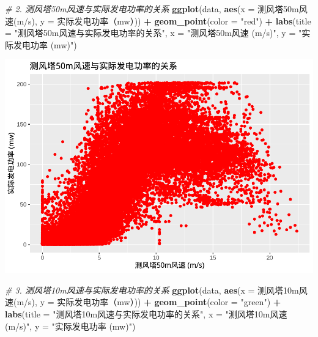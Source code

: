 \documentclass[
]{ctexart}
\newenvironment{Shaded}{\begin{snugshade}}{\end{snugshade}}
\newcommand{\AttributeTok}[1]{\textcolor[rgb]{0.13,0.29,0.53}{#1}}
\newcommand{\CommentTok}[1]{\textcolor[rgb]{0.56,0.35,0.01}{\textit{#1}}}
\newcommand{\FunctionTok}[1]{\textcolor[rgb]{0.13,0.29,0.53}{\textbf{#1}}}
\newcommand{\NormalTok}[1]{#1}
\newcommand{\SpecialCharTok}[1]{\textcolor[rgb]{0.81,0.36,0.00}{\textbf{#1}}}
\newcommand{\StringTok}[1]{\textcolor[rgb]{0.31,0.60,0.02}{#1}}
\begin{document}
\begin{Shaded}
\begin{Highlighting}[]
\CommentTok{\# 2. 测风塔50m风速与实际发电功率的关系}
\FunctionTok{ggplot}\NormalTok{(data, }\FunctionTok{aes}\NormalTok{(}\AttributeTok{x =} \StringTok{\textasciigrave{}}\AttributeTok{测风塔50m风速(m/s)}\StringTok{\textasciigrave{}}\NormalTok{, }\AttributeTok{y =} \StringTok{\textasciigrave{}}\AttributeTok{实际发电功率（mw）}\StringTok{\textasciigrave{}}\NormalTok{)) }\SpecialCharTok{+}
  \FunctionTok{geom\_point}\NormalTok{(}\AttributeTok{color =} \StringTok{"red"}\NormalTok{) }\SpecialCharTok{+}
  \FunctionTok{labs}\NormalTok{(}\AttributeTok{title =} \StringTok{"测风塔50m风速与实际发电功率的关系"}\NormalTok{,}
       \AttributeTok{x =} \StringTok{"测风塔50m风速 (m/s)"}\NormalTok{,}
       \AttributeTok{y =} \StringTok{"实际发电功率 (mw)"}\NormalTok{)}
\end{Highlighting}
\end{Shaded}

\includegraphics{1_files/figure-latex/unnamed-chunk-6-2.pdf}

\begin{Shaded}
\begin{Highlighting}[]
\CommentTok{\# 3. 测风塔10m风速与实际发电功率的关系}
\FunctionTok{ggplot}\NormalTok{(data, }\FunctionTok{aes}\NormalTok{(}\AttributeTok{x =} \StringTok{\textasciigrave{}}\AttributeTok{测风塔10m风速(m/s)}\StringTok{\textasciigrave{}}\NormalTok{, }\AttributeTok{y =} \StringTok{\textasciigrave{}}\AttributeTok{实际发电功率（mw）}\StringTok{\textasciigrave{}}\NormalTok{)) }\SpecialCharTok{+}
  \FunctionTok{geom\_point}\NormalTok{(}\AttributeTok{color =} \StringTok{"green"}\NormalTok{) }\SpecialCharTok{+}
  \FunctionTok{labs}\NormalTok{(}\AttributeTok{title =} \StringTok{"测风塔10m风速与实际发电功率的关系"}\NormalTok{,}
       \AttributeTok{x =} \StringTok{"测风塔10m风速 (m/s)"}\NormalTok{,}
       \AttributeTok{y =} \StringTok{"实际发电功率 (mw)"}\NormalTok{)}
\end{Highlighting}
\end{Shaded}
\end{document}
